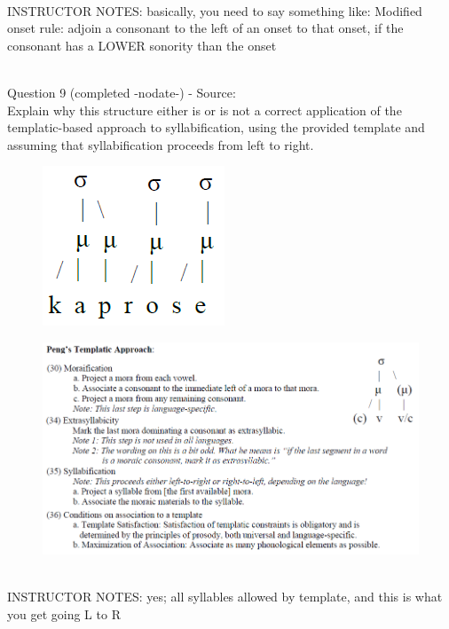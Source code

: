 \documentclass[12pt]{article}
\begin{document}
~\\
INSTRUCTOR NOTES: basically, you need to say something like: Modified onset rule: adjoin a consonant to the left of an onset to that onset, if the consonant has a LOWER sonority than the onset


~\\

{\large Question 9} (completed -nodate-) - Source: \\

Explain why this structure either is or is not a correct application of the templatic-based approach to syllabification, using the provided template and assuming that syllabification proceeds from left to right.\\

\begin{figure}[H]
\includegraphics{../images/pengtemplate_kaprose_yes.png}
\end{figure}
\begin{figure}[H]
\includegraphics{../images/peng_template_withdiagram.png}
\end{figure}

~\\
INSTRUCTOR NOTES: yes; all syllables allowed by template, and this is what you get going L to R


~\\
\end{document}
